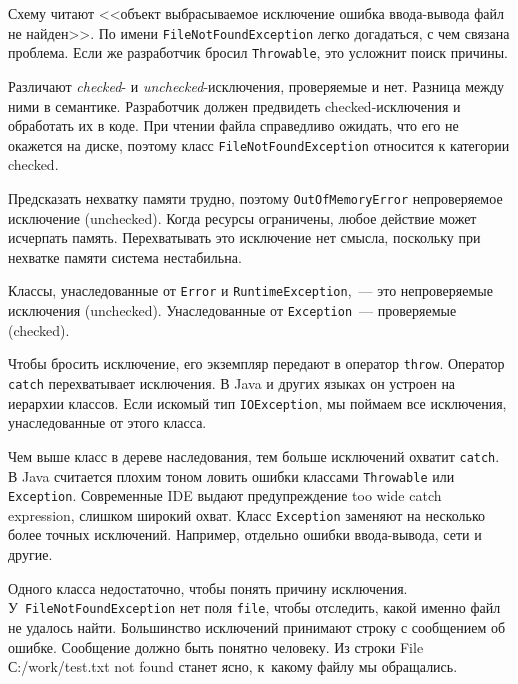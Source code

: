 \linegap


\linegap

Схему читают <<объект \arr выбрасываемое \arr исключение \arr ошибка
ввода-вывода \arr файл не найден>>. По имени \verb|FileNotFoundException|
легко догадаться, с чем связана проблема. Если же разработчик бросил
\verb|Throwable|, это усложнит поиск причины.

Различают \emph{checked}- и \emph{unchecked}-исключения, проверяемые и
нет. Разница между ними в семантике. Разработчик должен предвидеть checked-исключения и обработать их в коде. При чтении файла справедливо ожидать, что его
не окажется на диске, поэтому класс \verb|FileNotFoundException| относится к
категории checked.


\label{exc-hierarchy}

Предсказать нехватку памяти трудно, поэтому \verb|OutOfMemoryError|
непроверяемое исключение (unchecked). Когда ресурсы ограничены, любое действие
может исчерпать память. Перехватывать это исключение нет смысла, поскольку при
нехватке памяти система нестабильна.


Классы, унаследованные от \verb|Error| и \verb|RuntimeException|,~--- это
непроверяемые исключения (unchecked). Унаследованные от \verb|Exception|~---
проверяемые (checked).


Чтобы бросить исключение, его экземпляр передают в оператор
\verb|throw|. Оператор \verb|catch| перехватывает исключения. В Java и
других языках он устроен на иерархии классов. Если искомый тип
\verb|IOException|, мы поймаем все исключения, унаследованные от этого класса.

Чем выше класс в дереве наследования, тем больше исключений охватит
\verb|catch|. В Java считается плохим тоном ловить ошибки классами
\verb|Throwable| или \verb|Exception|. Современные IDE выдают предупреждение
too wide catch expression, слишком широкий охват. Класс \verb|Exception|
заменяют на несколько более точных исключений. Например, отдельно ошибки
ввода-вывода, сети и другие.

Одного класса недостаточно, чтобы понять причину
исключения. У~\verb|FileNotFoundException| нет поля \verb|file|, чтобы
отследить, какой именно файл не удалось найти. Большинство исключений принимают
строку с сообщением об ошибке. Сообщение должно быть понятно человеку. Из строки
File С:/work/test.txt not found станет ясно, к~какому файлу мы обращались.

